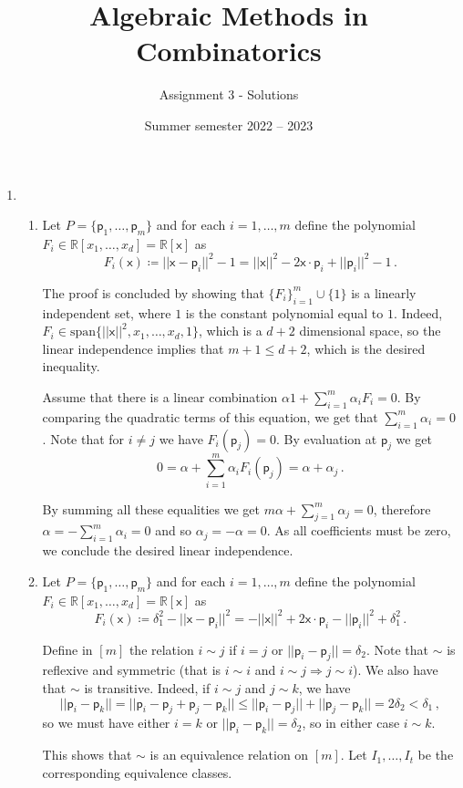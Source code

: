 \documentclass[kulak]{tplt}
\title{Algebraic Methods in Combinatorics}
\author{Assignment 3 - Solutions}
\date{Summer semester 2022 -- 2023}
\theoremstyle{definition}
\newcommand{\R}{\mathbb{R}}
\newcommand{\vx}{\mathsf{x}}
\newcommand{\vp}{\mathsf{p}}
\newcommand{\spn}{\mathrm{span}}
\begin{document}
\maketitle
\begin{enumerate}
\item 
\begin{enumerate}
\item
Let $P = \{\vp_1, \ldots, \vp_m \} $ and for each $i=1, \ldots, m$ define the polynomial $F_i \in \R[x_1, \ldots, x_d] = \R[\vx]$ as
$$ F_i ( \vx ) \coloneqq ||\vx - \vp_i ||^2 - 1  = ||\vx ||^2 - 2 \vx \cdot \vp_i + ||\vp_i||^2 - 1\, .$$

The proof is concluded by showing that $\{F_i\}_{i=1}^m \cup \{ 1 \}$ is a linearly independent set, where $1$ is the constant polynomial equal to $1$.
Indeed, $F_i \in \spn \{ ||\vx||^2, x_1, \ldots, x_d, 1\}$, which is a $d+2$ dimensional space, so the linear independence implies that $m+1 \leq d+2$, which is the desired inequality.

Assume that there is a linear combination $\alpha 1 + \sum_{i=1}^m \alpha_i F_i = 0 $.
By comparing the quadratic terms of this equation, we get that $\sum_{i=1}^m \alpha_i = 0$.
Note that for $i\neq j$ we have $F_i(\vp_j) = 0$.
By evaluation at $\vp_j $ we get 
$$ 0 = \alpha + \sum_{i=1}^m \alpha_i F_i(\vp_j) = \alpha + \alpha_j\, . $$

By summing all these equalities we get $m \alpha + \sum_{j=1}^m \alpha_j = 0$, therefore $\alpha = - \sum_{i=1}^m \alpha_i = 0$ and so $\alpha_j = - \alpha = 0$.
As all coefficients must be zero, we conclude the desired linear independence.

\item 
Let $P = \{\vp_1, \ldots, \vp_m \} $ and for each $i=1, \ldots, m$ define the polynomial $F_i \in \R[x_1, \ldots, x_d] = \R[\vx]$ as
$$ F_i ( \vx ) \coloneqq \delta_1^2 - ||\vx - \vp_i ||^2  = - ||\vx ||^2 + 2 \vx \cdot \vp_i - ||\vp_i||^2 + \delta_1^2\, .$$

Define in $[m]$ the relation $i\sim j $ if $i=j$ or $||\vp_i - \vp_j || = \delta_2$.
Note that $\sim $ is reflexive and symmetric (that is $i\sim i$ and $i\sim j \Rightarrow j \sim i$).
We also have that $\sim $ is transitive.
Indeed, if $i\sim j$ and $j \sim k$, we have 
$$||\vp_i - \vp_k ||  = || \vp_i - \vp_j + \vp_j - \vp_k||  \leq ||\vp_i - \vp_j || + ||\vp_j - \vp_k|| = 2\delta_2 < \delta_1 \, , $$
so we must have either $i=k$ or $||\vp_i - \vp_k|| = \delta_2$, so in either case $i \sim k$.

This shows that $\sim $ is an equivalence relation on $[m]$.
Let $I_1, \ldots, I_t $ be the corresponding equivalence classes.


\end{enumerate}
\end{enumerate}
\end{document}
